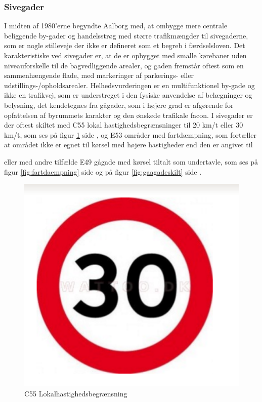 \subsubsection{Sivegader}
\label{subs:sivegader}

I midten af 1980’erne begyndte Aalborg med, at ombygge mere centrale beliggende by-gader og handelsstrøg med større trafikmængder til sivegaderne, som er nogle stilleveje der ikke er defineret som et begreb i færdselsloven. Det karakteristiske ved sivegader er, at de er opbygget med smalle kørebaner uden niveauforskelle til de bagvedliggende arealer, og gaden fremstår oftest som en sammenhængende flade, med markeringer af parkerings- eller udstillings-/opholdsarealer. Helhedsvurderingen er en multifunktionel by-gade og ikke en trafikvej, som er understreget i den fysiske anvendelse af belægninger og belysning, det kendetegnes fra gågader, som i højere grad er afgørende for opfattelsen af byrummets karakter og den ønskede trafikale facon. I sivegader er der oftest skiltet med C55 lokal hastighedsbegrænsninger til 20 km/t eller 30 km/t, som ses på figur \cref{fig:lokalhastighedfart} side \pageref{fig:lokalhastighedfart}, og E53 områder med fartdæmpning, som fortæller at området ikke er egnet til kørsel med højere hastigheder end den er angivet til\autocite{hs}


eller med andre tilfælde E49 gågade med kørsel tiltalt som undertavle, som ses på figur \cref{fig:fartdaempning} side \pageref{fig:fartdaempning} og på figur \cref{fig:gaagadeskilt} side \pageref{fig:gaagadeskilt}.\autocite{vejlednigomss2013}

\begin{figure}[htbp]
  \centering
  \begin{adjustbox}{max width=\textwidth}
    \includegraphics[scale=0.3]{figures/Billederogfigur/Indledningen/lokal_hastighedsberaensning_c55_30km.png}
 \end{adjustbox}
  \caption{C55 Lokalhastighedsbegrænsning \autocite{forbudsskilt2007}}
    \label{fig:lokalhastighedfart}
\end{figure}

